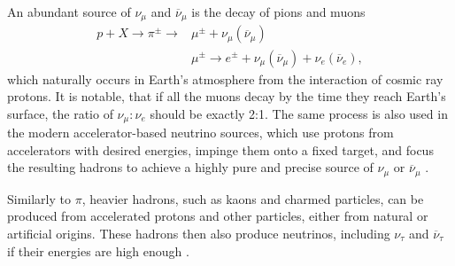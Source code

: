 
An abundant source of $\nu_\mu$ and $\overline{\nu}_\mu$ is the decay of pions and muons
\begin{align}
p+X \rightarrow \pi^\pm \rightarrow &\mu^\pm + \nu_\mu\left(\overline{\nu}_\mu\right) \\
 & \mu^\pm \rightarrow e^\pm + \nu_\mu\left(\overline{\nu}_\mu\right) + \nu_e\left(\overline{\nu}_e\right),
\end{align}
which naturally occurs in Earth's atmosphere from the interaction of cosmic ray protons. It is notable, that if all the muons decay by the time they reach Earth's surface, the ratio of $\nu_\mu : \nu_e$ should be exactly 2:1. The same process is also used in the modern accelerator-based neutrino sources, which use protons from accelerators with desired energies, impinge them onto a fixed target, and focus the resulting hadrons to achieve a highly pure and precise source of $\nu_\mu$ or $\overline{\nu}_\mu$ \cite{GoodmanAdvancesInNeutrinoPhysics.pdf, SchwartzAccelerators.pdf}.

Similarly to $\pi$, heavier hadrons, such as kaons and charmed particles, can be produced from accelerated protons and other particles, either from natural or artificial origins. These hadrons then also produce neutrinos, including $\nu_\tau$ and $\overline{\nu}_\tau$ if their energies are high enough \cite{ObservationOfTauNeutrino.pdf, FinalTauNeutrinoResultsDONUT2008.pdf}.


